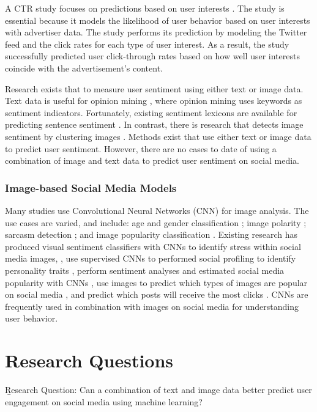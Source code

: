 \documentclass[mksc,blindrev]{informs3} %
\begin{document}
A CTR study focuses on predictions based on user interests \cite{Li2015}. The study is essential because it models the likelihood of user behavior based on user interests with advertiser data.  The study performs its prediction by modeling the Twitter feed and the click rates for each type of user interest. As a result, the study successfully predicted user click-through rates based on how well user interests coincide with the advertisement's content.

Research exists that to measure user sentiment using either text or image data. Text data is useful for opinion mining \cite{Liu2012}, where opinion mining uses keywords as sentiment indicators. Fortunately, existing sentiment lexicons are available for predicting sentence sentiment \cite{Georgiou2015}. In contrast, there is research that detects image sentiment by clustering images \cite{Wang2015}. Methods exist that use either text or image data to predict user sentiment. However, there are no cases to date of using a combination of image and text data to predict user sentiment on social media.

\subsubsection{Image-based Social Media Models}
Many studies use Convolutional Neural Networks (CNN) for image analysis. The use cases are varied, and include: age and gender classification \cite{Hassner2015}; image polarity \cite{Poria2016}; sarcasm detection \cite{Poria2016}; and image popularity classification \cite{Khosla2014}. Existing research has produced visual sentiment classifiers with CNNs \cite{Segalin2017,Xu2014} to identify stress within social media images, \cite{Lin2014}, use supervised CNNs to performed social profiling to identify personality traits \cite{Segalin2017}, perform sentiment analyses and estimated social media popularity with CNNs \cite{Gelli2015}, use images to predict which types of images are popular on social media \cite{Gelli2015}, and predict which posts will receive the most clicks \cite{Khosla2014}. CNNs are frequently used in combination with images on social media for understanding user behavior.

\section{Research Questions}
\b{Research Question:} Can a combination of text and image data better predict user engagement on social media using machine learning?
\end{document}

